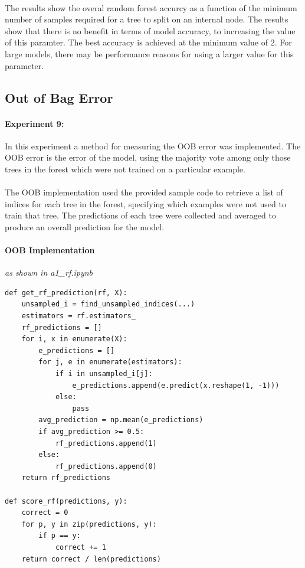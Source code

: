 \documentclass[12pt, letterpaper]{article}
\begin{document}
\paragraph*{}The results show the overal random forest accurcy as a function
of the minimum number of samples required for a tree to split on an internal node.
The results show that there is no benefit in terms of model accuracy, to increasing
the value of this paramter. The best accuracy is achieved at the minimum value of 2.
For large models, there may be performance reasons for using a larger value for this
parameter.

\subsection{Out of Bag Error}
\paragraph*{Experiment 9:}In this experiment a method for measuring the OOB error
was implemented. The OOB error is the error of the model, using the majority vote
among only those trees in the forest which were not trained on a particular example.

\paragraph*{}The OOB implementation used the provided sample code to retrieve a list
of indices for each tree in the forest, specifying which examples were not used
to train that tree. The predictions of each tree were collected and averaged to produce
an overall prediction for the model.

\paragraph*{\textbf{OOB Implementation}}\textit{as shown in a1\_rf.ipynb}

\begin{verbatim}
def get_rf_prediction(rf, X):
    unsampled_i = find_unsampled_indices(...)
    estimators = rf.estimators_
    rf_predictions = []
    for i, x in enumerate(X):
        e_predictions = []
        for j, e in enumerate(estimators):
            if i in unsampled_i[j]:
                e_predictions.append(e.predict(x.reshape(1, -1)))
            else:
                pass
        avg_prediction = np.mean(e_predictions)
        if avg_prediction >= 0.5:
            rf_predictions.append(1)
        else:
            rf_predictions.append(0)
    return rf_predictions

def score_rf(predictions, y):
    correct = 0
    for p, y in zip(predictions, y):
        if p == y:
            correct += 1
    return correct / len(predictions)
\end{verbatim}
\end{document}

